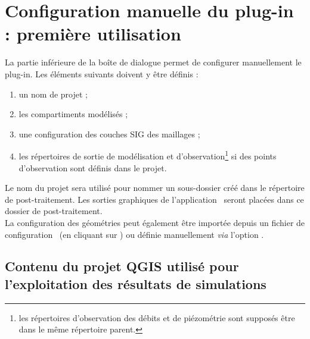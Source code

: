 \section{Configuration manuelle du plug-in : première utilisation}
\label{sec-config-manual}

La partie inférieure de la boîte de dialogue  permet de configurer
manuellement le plug-in. Les éléments suivants doivent y être définis :
\begin{enumerate}
    \item un nom de projet ;

    \item les compartiments modélisés ;

    \item une configuration des couches SIG des maillages ;

    \item les répertoires de sortie de modélisation et d'observation\footnote{les répertoires d'observation des débits et de piézométrie sont supposés être dans le même répertoire parent.} si des points d'observation sont définis dans le projet.
\end{enumerate}

Le nom du projet sera utilisé pour nommer un sous-dossier créé dans le répertoire
de post-traitement. Les sorties graphiques de l'application \cwv\ seront placées
dans ce dossier de post-traitement.\\

La configuration des géométries peut également être importée depuis un fichier de
configuration \json~(en cliquant sur )
ou définie manuellement \textit{via} l'option .


\subsection{Contenu du projet QGIS utilisé pour l'exploitation des résultats de
simulations \cawaqs}
\label{sec-res-cawaqs}

